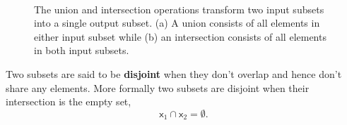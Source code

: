\documentclass[
  letterpaper,
  DIV=11,
  numbers=noendperiod]{scrartcl}
\begin{document}
\begin{figure}
\begin{minipage}[t]{0.45\linewidth}
{{}

}

\subcaption{\label{fig-binary-union}}
\end{minipage}%
%
\begin{minipage}[t]{0.45\linewidth}

{\centering 


}

\subcaption{\label{fig-binary-intersection}}
\end{minipage}%
%
\begin{minipage}[t]{0.05\linewidth}

{\centering 

~

}

\end{minipage}%

\caption{\label{fig-binary}The union and intersection operations
transform two input subsets into a single output subset. (a) A union
consists of all elements in either input subset while (b) an
intersection consists of all elements in both input subsets.}

\end{figure}

Two subsets are said to be \textbf{disjoint} when they don't overlap and
hence don't share any elements. More formally two subsets are disjoint
when their intersection is the empty set, \[
\mathsf{x}_{1} \cap \mathsf{x}_{2} = \emptyset.
\]
\end{document}
